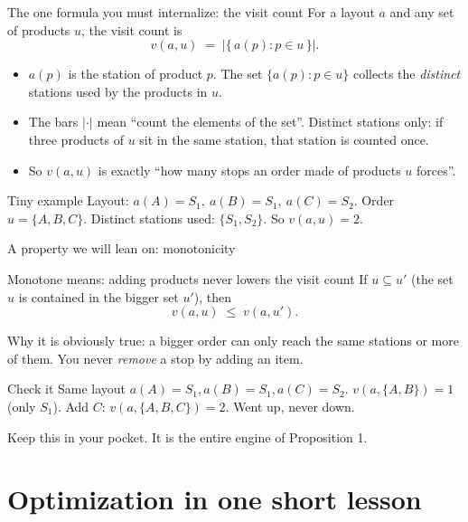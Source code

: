 \documentclass[11pt,aspectratio=169]{beamer}
\begin{document}
\begin{frame}{The one formula you must internalize: the visit count}
  For a layout $a$ and any set of products $u$, the visit count is
  \[
  v(a,u) \;=\; \big|\{\, a(p) : p \in u \,\}\big|.
  \]
  \begin{itemize}
    \item $a(p)$ is the station of product $p$. The set $\{a(p): p\in u\}$ collects the \emph{distinct} stations used by the products in $u$.
    \item The bars $|\cdot|$ mean ``count the elements of the set''. Distinct stations only: if three products of $u$ sit in the same station, that station is counted once.
    \item So $v(a,u)$ is exactly ``how many stops an order made of products $u$ forces''.
  \end{itemize}
  \begin{exampleblock}{Tiny example}
  Layout: $a(A){=}S_1,\ a(B){=}S_1,\ a(C){=}S_2$. Order $u=\{A,B,C\}$.
  Distinct stations used: $\{S_1, S_2\}$. So $v(a,u)=2$.
  \end{exampleblock}
\end{frame}

\begin{frame}{A property we will lean on: monotonicity}
  \begin{block}{Monotone means: adding products never lowers the visit count}
  If $u \subseteq u'$ (the set $u$ is contained in the bigger set $u'$), then
  \[
  v(a,u) \;\le\; v(a,u').
  \]
  \end{block}
  Why it is obviously true: a bigger order can only reach the same stations or more of them. You never \emph{remove} a stop by adding an item.
  \begin{exampleblock}{Check it}
  Same layout $a(A){=}S_1, a(B){=}S_1, a(C){=}S_2$.
  $v(a,\{A,B\})=1$ (only $S_1$). Add $C$: $v(a,\{A,B,C\})=2$. Went up, never down.
  \end{exampleblock}
  Keep this in your pocket. It is the entire engine of Proposition 1.
\end{frame}

\section{Optimization in one short lesson}
\end{document}
